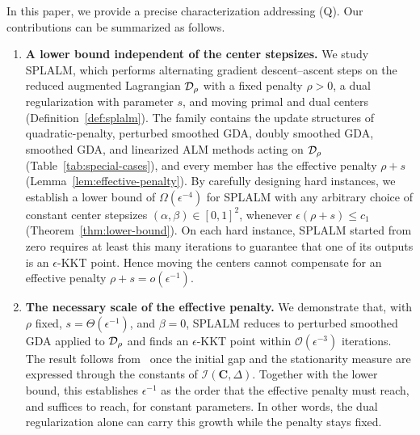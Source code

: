 In this paper, we provide a precise characterization addressing (Q). Our
contributions can be summarized as follows.
\begin{enumerate}
    \item \textbf{A lower bound independent of the center stepsizes.}
    We study SPLALM, which performs alternating gradient descent--ascent
    steps on the reduced augmented Lagrangian $\mathcal{D}_\rho$ with a fixed
    penalty $\rho>0$, a dual regularization with parameter $s$, and moving
    primal and dual centers (Definition~\ref{def:splalm}). The family contains
    the update structures of quadratic-penalty, perturbed smoothed GDA, doubly
    smoothed GDA, smoothed GDA, and linearized ALM methods acting on
    $\mathcal{D}_\rho$ (Table~\ref{tab:special-cases}), and every member has the
    effective penalty $\rho+s$ (Lemma~\ref{lem:effective-penalty}). By
    carefully designing hard instances, we establish a lower bound of
    $\Omega(\epsilon^{-4})$ for SPLALM with any arbitrary choice of constant
    center stepsizes $(\alpha,\beta)\in[0,1]^2$, whenever
    $\epsilon(\rho+s)\le c_1$ (Theorem~\ref{thm:lower-bound}). On each hard
    instance, SPLALM started from zero requires at least this many iterations
    to guarantee that one of its outputs is an $\epsilon$-KKT point. Hence
    moving the centers cannot compensate for an effective penalty
    $\rho+s=o(\epsilon^{-1})$.

    \item \textbf{The necessary scale of the effective penalty.}
    We demonstrate that, with $\rho$ fixed, $s=\Theta(\epsilon^{-1})$, and
    $\beta=0$, SPLALM reduces to perturbed smoothed GDA applied to
    $\mathcal{D}_\rho$ and finds an $\epsilon$-KKT point within
    $\mathcal O(\epsilon^{-3})$ iterations. The result follows
    from~\cite[Theorem~3.3]{li2026smoothing} once the initial gap and the
    stationarity measure are expressed through the constants of
    $\mathcal I(\mathbf C,\Delta)$. Together with the lower bound, this
    establishes $\epsilon^{-1}$ as the order that the effective penalty must
    reach, and suffices to reach, for constant parameters. In other words, the
    dual regularization alone can carry this growth while the penalty stays
    fixed.


\end{enumerate}
